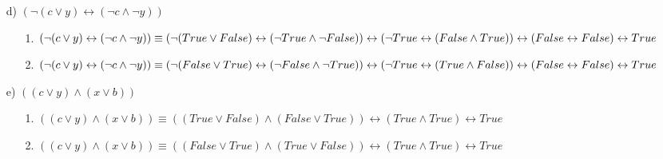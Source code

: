 \documentclass[10pt,a4paper]{article}
\begin{document}
\begin{enumerate}
\item[d)]$(\neg(c\vee y)\leftrightarrow (\neg c \wedge \neg y))$
	\begin{enumerate}
	\item[1.]$(\neg(c\vee y)\leftrightarrow (\neg c \wedge \neg y))\equiv (\neg(True\vee False)\leftrightarrow (\neg True \wedge \neg False)) \\ 
	\leftrightarrow \\ 
	(\neg True\leftrightarrow (False \wedge True))\\
	\leftrightarrow \\
	(False\leftrightarrow False)\\
	\leftrightarrow\\
	True$
	\item[2.]$(\neg(c\vee y)\leftrightarrow (\neg c \wedge \neg y))\equiv (\neg(False\vee True)\leftrightarrow (\neg False \wedge \neg True)) \\ 
	\leftrightarrow \\ 
	(\neg True\leftrightarrow (True \wedge False))\\
	\leftrightarrow \\
	(False\leftrightarrow False)\\
	\leftrightarrow\\
	True$
	\end{enumerate}
	
\item[e)]$((c\vee y)\wedge (x\vee b))$
	\begin{enumerate}
	\item[1.]$((c\vee y)\wedge (x\vee b))\equiv ((True\vee False)\wedge (False\vee True)) \leftrightarrow (True\wedge True)\leftrightarrow True$
	\item[2.]$((c\vee y)\wedge (x\vee b))\equiv ((False\vee True)\wedge (True\vee False)) \leftrightarrow (True\wedge True)\leftrightarrow True$
	\end{enumerate}
	

\end{enumerate}
\end{document}
